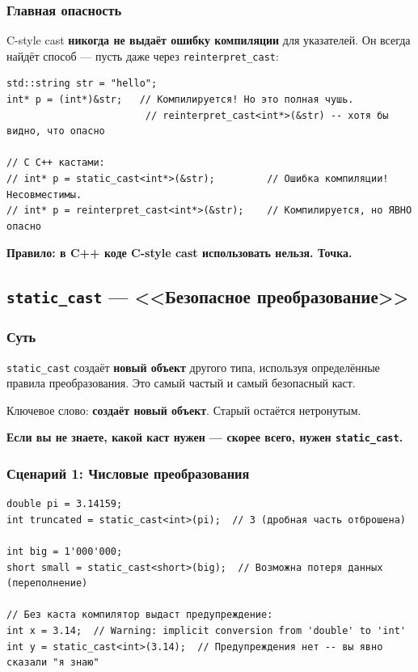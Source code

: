 \documentclass[a4paper,12pt]{article}
\begin{document}
\subsubsection{Главная опасность}

C-style cast \textbf{никогда не выдаёт ошибку компиляции} для указателей. Он всегда
найдёт способ --- пусть даже через \texttt{reinterpret\_cast}:

\begin{lstlisting}
std::string str = "hello";
int* p = (int*)&str;   // Компилируется! Но это полная чушь.
                        // reinterpret_cast<int*>(&str) -- хотя бы видно, что опасно

// С C++ кастами:
// int* p = static_cast<int*>(&str);         // Ошибка компиляции! Несовместимы.
// int* p = reinterpret_cast<int*>(&str);    // Компилируется, но ЯВНО опасно
\end{lstlisting}

\textbf{Правило: в C++ коде C-style cast использовать нельзя. Точка.}

\subsection{\texttt{static\_cast} --- <<Безопасное преобразование>>}

\subsubsection{Суть}

\texttt{static\_cast} создаёт \textbf{новый объект} другого типа, используя
определённые правила преобразования. Это самый частый и самый безопасный каст.

Ключевое слово: \textbf{создаёт новый объект}. Старый остаётся нетронутым.

\textbf{Если вы не знаете, какой каст нужен --- скорее всего, нужен \texttt{static\_cast}.}

\subsubsection{Сценарий 1: Числовые преобразования}

\begin{lstlisting}
double pi = 3.14159;
int truncated = static_cast<int>(pi);  // 3 (дробная часть отброшена)

int big = 1'000'000;
short small = static_cast<short>(big);  // Возможна потеря данных (переполнение)

// Без каста компилятор выдаст предупреждение:
int x = 3.14;  // Warning: implicit conversion from 'double' to 'int'
int y = static_cast<int>(3.14);  // Предупреждения нет -- вы явно сказали "я знаю"
\end{lstlisting}
\end{document}
